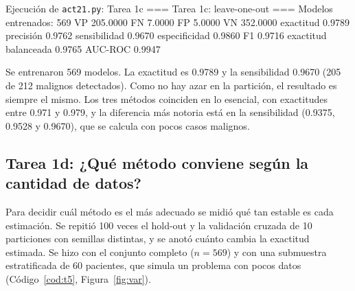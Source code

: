 \documentclass[11pt,letterpaper]{article}
\begin{document}
\begin{consola}[label=out:t4]{Ejecución de \texttt{act21.py}: Tarea 1c}
=== Tarea 1c: leave-one-out ===
Modelos entrenados: 569
VP                      205.0000
FN                        7.0000
FP                        5.0000
VN                      352.0000
exactitud                 0.9789
precisión                 0.9762
sensibilidad              0.9670
especificidad             0.9860
F1                        0.9716
exactitud balanceada      0.9765
AUC-ROC                   0.9947
\end{consola}

Se entrenaron 569 modelos. La exactitud es 0.9789 y la sensibilidad 0.9670 (205 de 212 malignos detectados). Como no hay azar en la partición, el resultado es siempre el mismo. Los tres métodos coinciden en lo esencial, con exactitudes entre 0.971 y 0.979, y la diferencia más notoria está en la sensibilidad (0.9375, 0.9528 y 0.9670), que se calcula con pocos casos malignos.

\subsection{Tarea 1d: ¿Qué método conviene según la cantidad de datos?}

Para decidir cuál método es el más adecuado se midió qué tan estable es cada estimación. Se repitió 100 veces el hold-out y la validación cruzada de 10 particiones con semillas distintas, y se anotó cuánto cambia la exactitud estimada. Se hizo con el conjunto completo ($n = 569$) y con una submuestra estratificada de 60 pacientes, que simula un problema con pocos datos (Código~\ref{cod:t5}, Figura~\ref{fig:var}).
\end{document}
